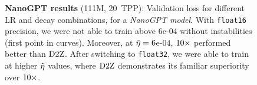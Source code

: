 \begin{figure}
  \centering
  \mbox{}
  \vspace{-1mm}
  \mbox{}
  \caption{\textbf{NanoGPT results} (111M, 20~TPP): Validation loss
    for different LR and decay combinations, for a \emph{NanoGPT
    model}.  With \texttt{float16} precision, we were not able to
    train above $6$e-$04$ without instabilities (first point in
    curves).  Moreover, at $\tilde{\eta} = 6$e-$04$, $\mbox{10}\times$ performed
    better than $\mbox{D2Z}$.  After switching to \texttt{float32}, we were
    able to train at higher $\tilde{\eta}$ values, where $\mbox{D2Z}$
    demonstrates its familiar superiority over
    $\mbox{10}\times$.\label{fig:maxlr_nanogpt_curves}}
\end{figure}
